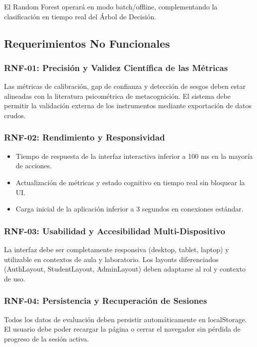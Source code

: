 \documentclass[11pt,a4paper]{article}
\begin{document}
El Random Forest operará en modo batch/offline, complementando la clasificación en tiempo real del Árbol de Decisión.

\subsection{Requerimientos No Funcionales}

\subsubsection{RNF-01: Precisión y Validez Científica de las Métricas}

Las métricas de calibración, gap de confianza y detección de sesgos deben estar alineadas con la literatura psicométrica de metacognición. El sistema debe permitir la validación externa de los instrumentos mediante exportación de datos crudos.

\subsubsection{RNF-02: Rendimiento y Responsividad}

\begin{itemize}
    \item Tiempo de respuesta de la interfaz interactiva inferior a 100 ms en la mayoría de acciones.
    \item Actualización de métricas y estado cognitivo en tiempo real sin bloquear la UI.
    \item Carga inicial de la aplicación inferior a 3 segundos en conexiones estándar.
\end{itemize}

\subsubsection{RNF-03: Usabilidad y Accesibilidad Multi-Dispositivo}

La interfaz debe ser completamente responsiva (desktop, tablet, laptop) y utilizable en contextos de aula y laboratorio. Los layouts diferenciados (AuthLayout, StudentLayout, AdminLayout) deben adaptarse al rol y contexto de uso.

\subsubsection{RNF-04: Persistencia y Recuperación de Sesiones}

Todos los datos de evaluación deben persistir automáticamente en localStorage. El usuario debe poder recargar la página o cerrar el navegador sin pérdida de progreso de la sesión activa.
\end{document}
